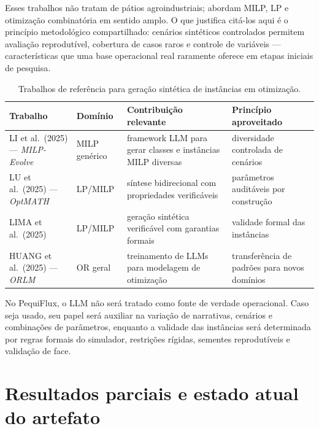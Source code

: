 \documentclass[
  12pt,
  oneside,
  a4paper,
  sumario=tradicional,
  brazil
]{abntex2}
\begin{document}
Esses trabalhos n\~ao tratam de p\'atios agroindustriais; abordam MILP, LP e otimiza\c{c}\~ao combinat\'oria em sentido amplo. O que justifica cit\'a-los aqui \'e o princ\'ipio metodol\'ogico compartilhado: cen\'arios sint\'eticos controlados permitem avalia\c{c}\~ao reprodut\'ivel, cobertura de casos raros e controle de vari\'aveis --- caracter\'isticas que uma base operacional real raramente oferece em etapas iniciais de pesquisa.

\begin{table}[H]
\centering
\small
\renewcommand{\arraystretch}{1.18}
\begin{tabularx}{\textwidth}{@{}P{0.25\textwidth}P{0.15\textwidth}YP{0.22\textwidth}@{}}
\toprule
\textbf{Trabalho} & \textbf{Dom\'inio} & \textbf{Contribui\c{c}\~ao relevante} & \textbf{Princ\'ipio aproveitado} \\
\midrule
LI et al.\ (2025) --- \textit{MILP-Evolve} & MILP gen\'erico & framework LLM para gerar classes e inst\^ancias MILP diversas & diversidade controlada de cen\'arios \\
\addlinespace
LU et al.\ (2025) --- \textit{OptMATH} & LP/MILP & s\'intese bidirecional com propriedades verific\'aveis & par\^ametros audit\'aveis por constru\c{c}\~ao \\
\addlinespace
LIMA et al.\ (2025) & LP/MILP & gera\c{c}\~ao sint\'etica verific\'avel com garantias formais & validade formal das inst\^ancias \\
\addlinespace
HUANG et al.\ (2025) --- \textit{ORLM} & OR geral & treinamento de LLMs para modelagem de otimiza\c{c}\~ao & transfer\^encia de padr\~oes para novos dom\'inios \\
\bottomrule
\end{tabularx}
\caption{Trabalhos de refer\^encia para gera\c{c}\~ao sint\'etica de inst\^ancias em otimiza\c{c}\~ao.}
\end{table}

No PequiFlux, o LLM n\~ao ser\'a tratado como fonte de verdade operacional. Caso seja usado, seu papel ser\'a auxiliar na varia\c{c}\~ao de narrativas, cen\'arios e combina\c{c}\~oes de par\^ametros, enquanto a validade das inst\^ancias ser\'a determinada por regras formais do simulador, restri\c{c}\~oes r\'igidas, sementes reprodut\'iveis e valida\c{c}\~ao de face.

\chapter{Resultados parciais e estado atual do artefato}
\end{document}
